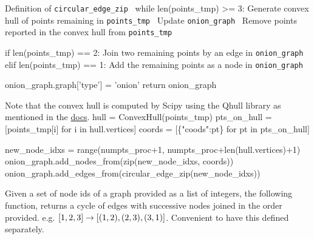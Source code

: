      \LA{} Definition of \verb|circular_edge_zip|~{\nwtagstyle{}}\RA{}
     while len(points_tmp) >= 3:
           \LA{}Generate convex hull of points remaining in \verb|points_tmp|~{\nwtagstyle{}}\RA{}
           \LA{}Update \verb|onion_graph|~{\nwtagstyle{}}\RA{}
           \LA{}Remove points reported in the convex hull from \verb|points_tmp|~{\nwtagstyle{}}\RA{}

     if len(points_tmp) == 2:
          \LA{}Join two remaining points by an edge in \verb|onion_graph|~{\nwtagstyle{}}\RA{}
     elif len(points_tmp) == 1:
          \LA{}Add the remaining points as a node in \verb|onion_graph|~{\nwtagstyle{}}\RA{}
 
     onion_graph.graph['type'] = 'onion'
     return onion_graph
\nwendcode{}\nwdocspar


Note that the convex hull is computed by Scipy using the Qhull library as mentioned in the \href{https://docs.scipy.org/doc/scipy/reference/generated/scipy.spatial.ConvexHull.html}{docs}. 
\nwenddocs{}\endmoddef\nwstartdeflinemarkup{}\nwenddeflinemarkup
hull            = ConvexHull(points_tmp)
pts_on_hull     = [points_tmp[i] for i in hull.vertices]
coords          = [\{"coods":pt\} for pt in pts_on_hull]
\nwendcode{}\nwdocspar


\nwenddocs{}\endmoddef\nwstartdeflinemarkup{}\nwenddeflinemarkup
new_node_idxs   = range(numpts_proc+1, numpts_proc+len(hull.vertices)+1)
onion_graph.add_nodes_from(zip(new_node_idxs, coords))
onion_graph.add_edges_from(circular_edge_zip(new_node_idxs))
\nwendcode{}\nwdocspar


Given a set of node ids of a graph provided as a list of 
integers, the following function, returns a cycle of edges with successive nodes joined in
the order provided. e.g. $[1,2,3] \rightarrow [(1,2),(2,3),(3,1)]$. Convenient to have this defined 
separately. 

